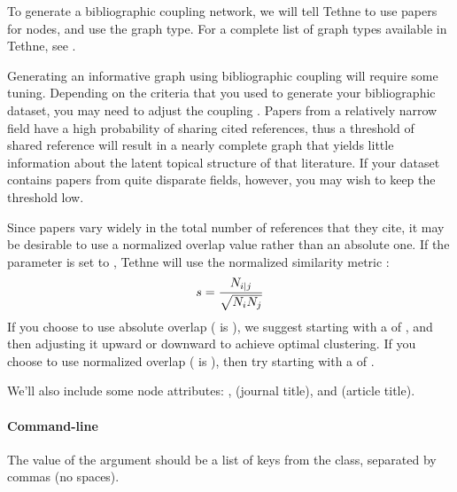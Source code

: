 \documentclass[letterpaper,10pt,english]{sphinxmanual}
\begin{document}
To generate a bibliographic coupling network, we will tell Tethne to use papers for
nodes, and use the  graph type. For a complete list of graph
types available in Tethne, see {\hyperref[tethne.networks:module-tethne.networks]{}}.

Generating an informative graph using bibliographic coupling will require some tuning.
Depending on the criteria that you used to generate your bibliographic dataset, you may
need to adjust the coupling . Papers from a relatively narrow field have a
high probability of sharing cited references, thus a threshold of  shared reference
will result in a nearly complete graph that yields little information about the latent
topical structure of that literature. If your dataset contains papers from quite disparate
fields, however, you may wish to keep the threshold low.

Since papers vary widely in the total number of references that they cite, it may be
desirable to use a normalized overlap value rather than an absolute one. If the
 parameter is set to , Tethne will use the normalized similarity
metric :
\begin{gather}
\begin{split}s = \frac{N_{i|j}}{\sqrt{ N_i N_j }}\end{split}\notag
\end{gather}
If you choose to use absolute overlap ( is ), we suggest starting
with a  of , and then adjusting it upward or downward to achieve optimal
clustering. If you choose to use normalized overlap ( is ), then try
starting with a  of .

We'll also include some node attributes: ,  (journal title), and
 (article title).


\paragraph{Command-line}
\label{tutorial.bibliocoupling:id5}
The value of the  argument should be a list of keys from the
{\hyperref[tethne:tethne.data.Paper]{}} class, separated by commas (no spaces).
\end{document}
